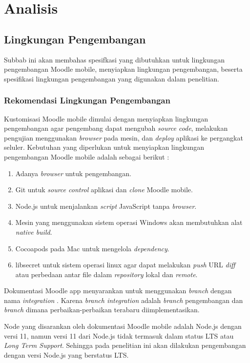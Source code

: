 \chapter{Analisis}
\label{chap:analsa}


\section{Lingkungan Pengembangan}
 Subbab ini akan membahas spesifkasi yang dibutuhkan untuk lingkungan pengembangan Moodle mobile, menyiapkan lingkungan pengembangan, beserta spesifikasi lingkungan pengembangan yang digunakan dalam penelitian.

\subsection{Rekomendasi Lingkungan Pengembangan}
Kustomisasi Moodle mobile dimulai dengan menyiapkan lingkungan pengembangan agar pengembang dapat mengubah \textit{source code}, melakukan pengujian menggunakan \textit{browser} pada mesin, dan \textit{deploy} aplikasi ke pergangkat seluler. Kebutuhan yang diperlukan untuk menyiapkan lingkungan pengembangan Moodle mobile adalah sebagai berikut : \cite{moodle:dev}


\begin{enumerate}
	\item Adanya \textit{browser} untuk pengembangan.
	\item Git untuk \textit{source control} aplikasi dan \textit{clone} Moodle mobile.
	\item Node.js untuk menjalankan \textit{script} JavaScript tanpa \textit{browser}.
	\item Mesin yang menggunakan sistem operasi Windows akan membutuhkan alat \textit{native build}.
	\item Cocoapods pada Mac untuk mengelola \textit{dependency}.
	\item libsecret untuk sistem operasi linux agar dapat melakukan \textit{push} URL \textit{diff} atau perbedaan antar file dalam \textit{repository} lokal dan \textit{remote}.
\end{enumerate}


Dokumentasi Moodle app menyarankan untuk menggunakan \textit{branch} dengan nama \textit{integration} \cite{moodle:dev}. Karena \textit{branch integration} adalah \textit{branch} pengembangan dan \textit{branch} dimana perbaikan-perbaikan terabaru diimplementasikan.

Node yang disarankan oleh dokumentasi Moodle mobile adalah Node.js dengan versi 11\cite{moodle:dev}, namun versi 11 dari Node.js tidak termasuk dalam status LTS atau \textit{Long Term Support}\cite{nodejs:status}. Sehingga pada penelitian ini akan dilakukan pengembangan dengan versi Node.js yang berstatus LTS.

